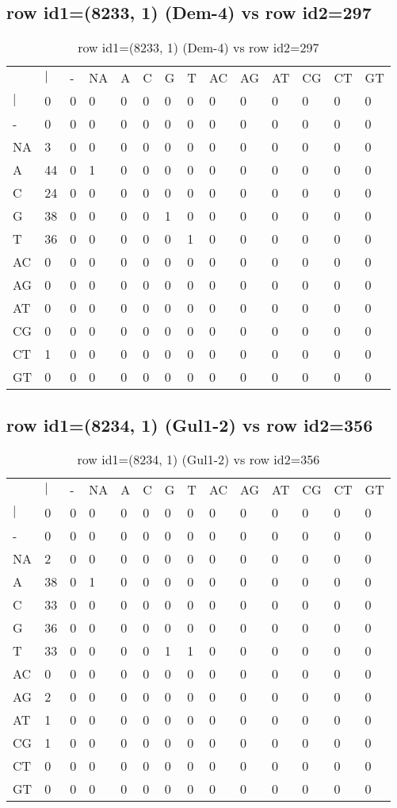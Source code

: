 \subsection{row id1=(8233, 1) (Dem-4) vs row id2=297}
\begin{center}
\begin{longtable}{|l|l|l|l|l|l|l|l|l|l|l|l|l|l|}
\caption{row id1=(8233, 1) (Dem-4) vs row id2=297} \label{table_dm156}\\
\hline
\\
\hline
&$|$&-&NA&A&C&G&T&AC&AG&AT&CG&CT&GT\\
$|$&0&0&0&0&0&0&0&0&0&0&0&0&0\\
-&0&0&0&0&0&0&0&0&0&0&0&0&0\\
NA&3&0&0&0&0&0&0&0&0&0&0&0&0\\
A&44&0&1&0&0&0&0&0&0&0&0&0&0\\
C&24&0&0&0&0&0&0&0&0&0&0&0&0\\
G&38&0&0&0&0&1&0&0&0&0&0&0&0\\
T&36&0&0&0&0&0&1&0&0&0&0&0&0\\
AC&0&0&0&0&0&0&0&0&0&0&0&0&0\\
AG&0&0&0&0&0&0&0&0&0&0&0&0&0\\
AT&0&0&0&0&0&0&0&0&0&0&0&0&0\\
CG&0&0&0&0&0&0&0&0&0&0&0&0&0\\
CT&1&0&0&0&0&0&0&0&0&0&0&0&0\\
GT&0&0&0&0&0&0&0&0&0&0&0&0&0\\
\hline
\end{longtable}
\end{center}

\subsection{row id1=(8234, 1) (Gul1-2) vs row id2=356}
\begin{center}
\begin{longtable}{|l|l|l|l|l|l|l|l|l|l|l|l|l|l|}
\caption{row id1=(8234, 1) (Gul1-2) vs row id2=356} \label{table_dm158}\\
\hline
\\
\hline
&$|$&-&NA&A&C&G&T&AC&AG&AT&CG&CT&GT\\
$|$&0&0&0&0&0&0&0&0&0&0&0&0&0\\
-&0&0&0&0&0&0&0&0&0&0&0&0&0\\
NA&2&0&0&0&0&0&0&0&0&0&0&0&0\\
A&38&0&1&0&0&0&0&0&0&0&0&0&0\\
C&33&0&0&0&0&0&0&0&0&0&0&0&0\\
G&36&0&0&0&0&0&0&0&0&0&0&0&0\\
T&33&0&0&0&0&1&1&0&0&0&0&0&0\\
AC&0&0&0&0&0&0&0&0&0&0&0&0&0\\
AG&2&0&0&0&0&0&0&0&0&0&0&0&0\\
AT&1&0&0&0&0&0&0&0&0&0&0&0&0\\
CG&1&0&0&0&0&0&0&0&0&0&0&0&0\\
CT&0&0&0&0&0&0&0&0&0&0&0&0&0\\
GT&0&0&0&0&0&0&0&0&0&0&0&0&0\\
\hline
\end{longtable}
\end{center}

